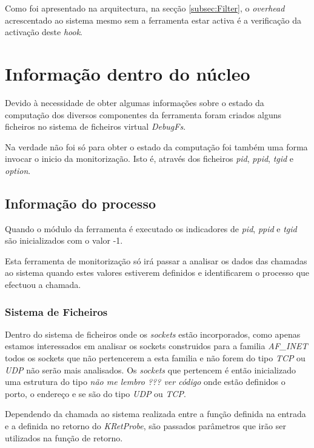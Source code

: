 Como foi apresentado na arquitectura, na secção \ref{subsec:Filter}, o
\textit{overhead} acrescentado ao sistema mesmo sem a ferramenta estar activa é
a verificação da activação deste \textit{hook}.

\section{Informação dentro do núcleo}

Devido à necessidade de obter algumas informações sobre o estado da computação
dos diversos componentes da ferramenta foram criados alguns ficheiros no
sistema de ficheiros virtual \textit{DebugFs}.

Na verdade não foi só para obter o estado da computação foi também uma forma
invocar o inicio da monitorização. Isto é, através dos ficheiros \textit{pid},
\textit{ppid}, \textit{tgid} e \textit{option}. 

\subsection{Informação do processo}

Quando o módulo da ferramenta é executado os indicadores de \textit{pid},
\textit{ppid} e \textit{tgid} são inicializados com o valor -1.

Esta ferramenta de monitorização só irá passar a analisar os dados das chamadas
ao sistema quando estes valores estiverem definidos e identificarem o processo
que efectuou a chamada.

\subsubsection{Sistema de Ficheiros}

Dentro do sistema de ficheiros onde os \textit{sockets} estão incorporados,
como apenas estamos interessados em analisar os sockets construidos para a
familia \textit{AF\_INET} todos os sockets que não pertencerem a esta familia e
não forem do tipo \textit{TCP} ou \textit{UDP} não serão mais analisados. Os
\textit{sockets} que pertencem é então inicializado uma estrutura do tipo
\textit{não me lembro ??? ver código} onde estão definidos o porto, o endereço
e se são do tipo \textit{UDP} ou \textit{TCP}.

Dependendo da chamada ao sistema realizada entre a função definida na entrada
e a definida no retorno do \textit{KRetProbe}, são passados parâmetros que irão
ser utilizados na função de retorno.


